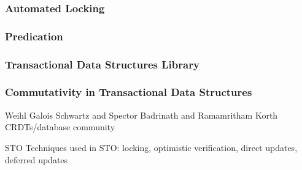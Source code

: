 \subsubsection{Automated Locking}
\subsubsection{Predication}
\subsubsection{Transactional Data Structures Library}
\subsubsection{Commutativity in Transactional Data Structures}
Weihl
Galois
Schwartz and Spector
Badrinath and Ramamritham
Korth
CRDTs/database community

STO
Techniques used in STO: locking, optimistic verification, direct updates, deferred updates

